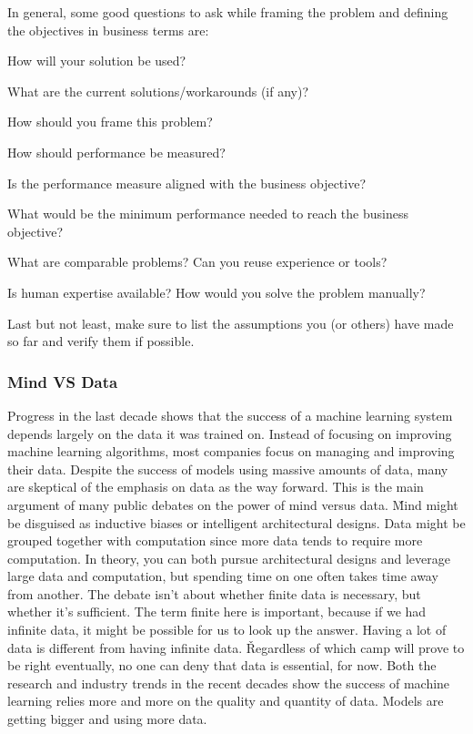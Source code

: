 In general, some good questions to ask while framing the problem and defining the objectives in business terms are:
\bit
\item How will your solution be used?
\item What are the current solutions/workarounds (if any)?
\item How should you frame this problem?
\item How should performance be measured?
\item Is the performance measure aligned with the business objective?
\item What would be the minimum performance needed to reach the business objective?
\item What are comparable problems? Can you reuse experience or tools?
\item Is human expertise available? How would you solve the problem manually?
\eit

Last but not least, make sure to list the assumptions you (or others) have made so far and verify them if possible.

\subsubsection{Mind VS Data}

Progress in the last decade shows that the success of a machine learning system depends largely on the data it was
trained on. Instead of focusing on improving machine learning algorithms, most companies focus on managing and
improving their data. Despite the success of models using massive amounts of data, many are skeptical of the emphasis
on data as the way forward. This is the main argument of many public debates on the power of mind versus data. \v

Mind might be disguised as inductive biases or intelligent architectural designs. Data might be grouped together with
computation since more data tends to require more computation. In theory, you can both pursue architectural designs
and leverage large data and computation, but spending time on one often takes time away from another. The debate isn't
about whether finite data is necessary, but whether it's sufficient. The term finite here is important, because if
we had infinite data, it might be possible for us to look up the answer. Having a lot of data is different from having
infinite data. \v

Regardless of which camp will prove to be right eventually, no one can deny that data is essential, for now. Both the
research and industry trends in the recent decades show the success of machine learning relies more and more on the
quality and quantity of data. Models are getting bigger and using more data.


